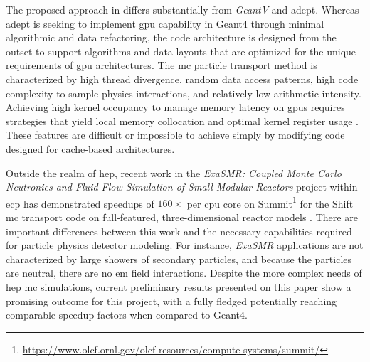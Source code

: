 The proposed approach in \celeritas differs substantially from \emph{GeantV} and
\acs{adept}. Whereas \acs{adept} is seeking to implement \ac{gpu} capability in
Geant4 through minimal algorithmic and data refactoring, the \celeritas code
architecture is designed from the outset to support algorithms and data layouts
that are optimized for the unique requirements of \ac{gpu} architectures. The
\ac{mc} particle transport method is characterized by high thread divergence,
random data access patterns, high code complexity to sample physics
interactions, and relatively low arithmetic intensity.  Achieving high kernel
occupancy to manage memory latency on \acp{gpu} requires strategies that yield
local memory collocation and optimal kernel register usage
\cite{hamilton_continuous-energy_2019}.  These features are difficult or
impossible to achieve simply by modifying code designed for cache-based
architectures.

Outside the realm of \ac{hep}, recent work in the \emph{ExaSMR: Coupled Monte
Carlo Neutronics and Fluid Flow Simulation of Small Modular Reactors} project
within \ac{ecp} has demonstrated speedups of $160\times$ per \ac{cpu} core on
Summit\footnote {
    \url{https://www.olcf.ornl.gov/olcf-resources/compute-systems/summit/}
} for the Shift \ac{mc} transport code on full-featured, three-dimensional
reactor models \cite{hamilton_continuous-energy_2019}. There are important
differences between this work and the necessary capabilities required for
particle physics detector modeling. For instance, \emph{ExaSMR} applications are
not characterized by large showers of secondary particles, and because the
particles are neutral, there are no \ac{em} field interactions. Despite the more
complex needs of \ac{hep} \ac{mc} simulations, current preliminary results
presented on this paper show a promising outcome for this project, with a fully
fledged \celeritas potentially reaching comparable speedup factors when compared
to Geant4.
